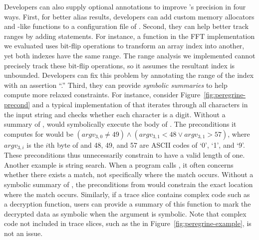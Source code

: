 Developers can also supply optional annotations to improve \peregrine's
precision in four ways.  First, for better alias results, developers can
add custom memory allocators and -like functions to a
configuration file of \peregrine.  Second, they can help \peregrine better track
ranges by adding  statements.  For instance, a function in the
FFT implementation we evaluated uses bit-flip operations to transform an
array index into another, yet both indexes have the same range.  The range
analysis we implemented cannot precisely track these bit-flip operations,
so it assumes the resultant index is unbounded.  Developers can fix this
problem by annotating the range of the index with an assertion
``.''  Third, they can provide \emph{symbolic
  summaries} to help \peregrine compute more relaxed constraints.  For instance,
consider Figure~\ref{fig:peregrine-precond} and a typical implementation of
 that iterates through all characters in the input string and
checks whether each character is a digit.  Without a summary of ,
\peregrine would symbolically execute the body of .  The preconditions
it computes for  would be $ (argv_{3,0} \neq 49) \wedge
(argv_{3,1} < 48 \vee argv_{3,1} > 57)$, where $argv_{3,i}$ is the $i$th
byte of  and 48, 49, and 57 are ASCII codes of `0', `1', and
`9'.  These preconditions thus unnecessarily constrain  to
have a valid length of one.  Another example is string search.  When a
program calls , it often concerns whether there exists a
match, not specifically where the match occurs.  Without a symbolic
summary of , the preconditions from  would
constrain the exact location where the match occurs.  Similarly, if a
trace slice contains complex code such as a decryption function, users can
provide a summary of this function to mark the decrypted data as symbolic
when the argument is symbolic.  Note that complex code not included in
trace slices, such as the  in Figure~\ref{fig:peregrine-example}, is not an
issue.

